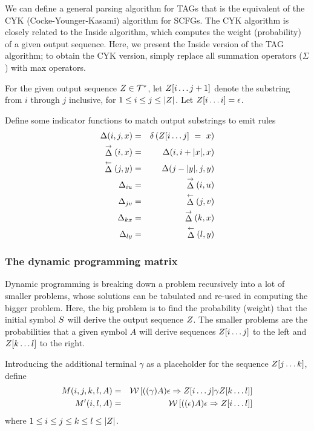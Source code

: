 \documentclass[10pt]{article}
\begin{document}
We can define a general parsing algorithm for TAGs
that is the equivalent of the CYK (Cocke-Younger-Kasami) algorithm for SCFGs.
The CYK algorithm is closely related to the Inside algorithm,
which computes the weight (probability) of a given output sequence.
Here, we present the Inside version of the TAG algorithm;
to obtain the CYK version, simply replace all summation operators ($\Sigma$)
with max operators.

For the given output sequence $Z \in {\cal T}^\ast$, let $Z[i \ldots j+1]$ denote the substring from $i$ through $j$ inclusive, for $1 \leq i \leq j \leq |Z|$.
Let $Z[i \ldots i] = \epsilon$.

\newcommand\match{\Delta}
\newcommand\fmatch{\stackrel{\rightarrow}{\match}}
\newcommand\rmatch{\stackrel{\leftarrow}{\match}}
\newcommand\iumatch{\match_{iu}}
\newcommand\jvmatch{\match_{jv}}
\newcommand\kxmatch{\match_{kx}}
\newcommand\lymatch{\match_{ly}}

Define some indicator functions to match output substrings to emit rules
\begin{eqnarray*}
\match(i,j,x) & = & \delta \left( \outsubseq{i}{j}\ =\ x \right) \\
\fmatch(i,x) & = & \match(i,i+|x|,x) \\
\rmatch(j,y) & = & \match(j-|y|,j,y) \\
\iumatch & = & \fmatch(i,u) \\
\jvmatch & = & \rmatch(j,v) \\
\kxmatch & = & \fmatch(k,x) \\
\lymatch & = & \rmatch(l,y)
\end{eqnarray*}

\subsubsection{The dynamic programming matrix}

\newcommand\m{M}
\newcommand\mtip{\m'}

Dynamic programming is breaking down a problem recursively into a lot of smaller problems,
whose solutions can be tabulated and re-used in computing the bigger problem.
Here, the big problem is to find the probability (weight) that the initial symbol $S$ will derive the output sequence $Z$.
The smaller problems are the probabilities that a given symbol $A$ will derive sequences $Z[i \ldots j]$ to the left and $Z[k \ldots l]$ to the right.

Introducing the additional terminal $\gamma$ as a placeholder for the sequence $Z[j \ldots k]$, define
\begin{eqnarray*}
\m(i,j,k,l,A) & = & \seqweight{((\gamma)A)\epsilon}{\outsubseq{i}{j} \gamma \outsubseq{k}{l}} \\
\mtip(i,l,A) & = & \seqweight{((\epsilon)A)\epsilon}{\outsubseq{i}{l}}
\end{eqnarray*}
where $1 \leq i \leq j \leq k \leq l \leq |Z|$.
\end{document}
